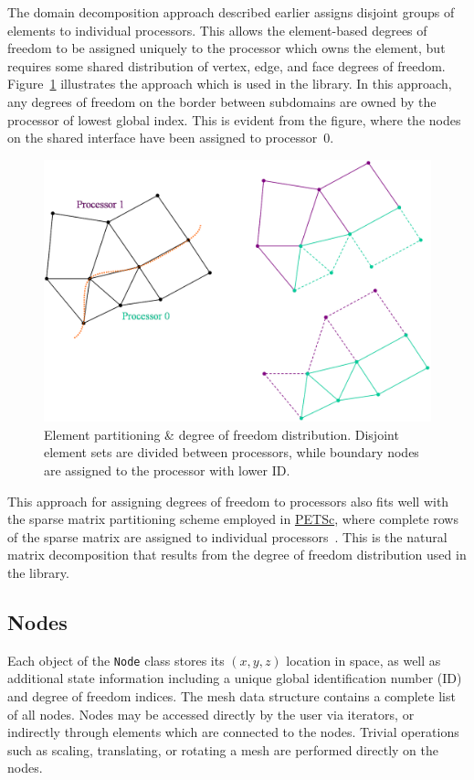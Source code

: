 \documentclass[global,twocolumn,final]{svjour}
\newcommand{\PETSc}{\href{http://www-unix.mcs.anl.gov/petsc/petsc-2}{PETSc}}
\begin{document}
The domain decomposition approach described earlier assigns disjoint
groups of elements to individual processors.  This allows the
element-based degrees of freedom to be assigned uniquely to the
processor which owns the element, but requires some shared
distribution of vertex, edge, and face degrees of freedom.
Figure~\ref{fig:dofs_dd} illustrates the approach which is used in the
library. In this approach, any degrees of freedom on the border
between subdomains are owned by the processor of lowest
global index.  This is evident from the figure, where the nodes on the
shared interface have been assigned to processor~0.
\begin{figure}[hbtp]
  \begin{center}
    \includegraphics[width=\columnwidth]{figures/dofs}
    \caption{Element partitioning \& degree of freedom
      distribution.  Disjoint element sets are divided between
processors, while boundary nodes are assigned to the processor with
lower ID.\label{fig:dofs_dd}}
  \end{center}
\end{figure}

This approach for assigning degrees of freedom to processors also fits
well with the sparse matrix partitioning scheme employed in \PETSc{},
where complete rows of the sparse matrix are assigned to individual
processors~\cite{petsc_manual}.  This is the natural matrix
decomposition that results from the degree of freedom distribution
used in the library.

\subsection{Nodes}
Each object of the \texttt{Node} class stores its $(x,y,z)$ location
in space, as
well as additional state information including a unique global identification
number (ID) and degree of freedom indices.  The mesh data structure
contains a complete list of all nodes.  Nodes may be accessed directly
by the user via iterators, or indirectly through elements which are
connected to the nodes. Trivial operations such as scaling,
translating, or rotating a mesh are performed directly on the nodes.
\end{document}
